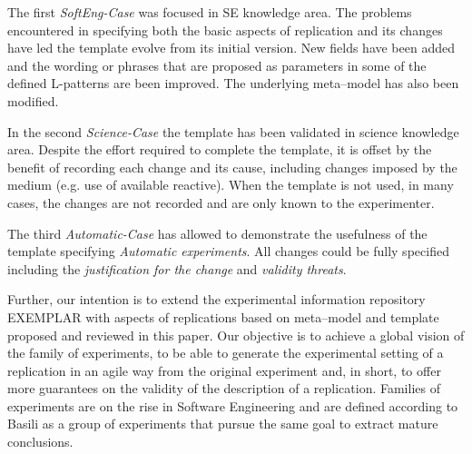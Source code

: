 The first \emph{SoftEng-Case} was focused in \gls{SE} knowledge area. The problems encountered in specifying both the basic aspects of replication and its changes have led the template evolve from its initial version. New fields have been added and the wording or phrases that are proposed as parameters in some of the defined L-patterns are been improved. The underlying meta--model has also been modified. 

In the second \emph{Science-Case} the template has been validated in science knowledge area. 
Despite the effort required to complete the template, it is offset by the benefit of recording each change and its cause, including changes imposed by the medium (e.g. use of available reactive). 
When the template is not used, in many cases, the changes are not recorded and are only known to the experimenter.

The third \emph{Automatic-Case} has allowed to demonstrate the usefulness of the template specifying \emph{Automatic experiments}. All changes could be fully specified including the \emph{justification for the change} and \emph{validity threats}.

Further, our intention is to extend the experimental information repository EXEMPLAR \cite{ParejoExemplar2014} with aspects of replications based on meta--model and template proposed and reviewed in this paper. Our objective is to achieve a global vision of the family of experiments, to be able to generate the experimental setting of a replication in an agile way from the original experiment and, in short, to offer more guarantees on the validity of the description of a replication. %
Families of experiments are on the rise in Software Engineering \cite{santos2018analyzing} and are defined according to Basili \etal \cite{basili1999building} as a group of experiments that pursue the same goal to extract mature conclusions.

